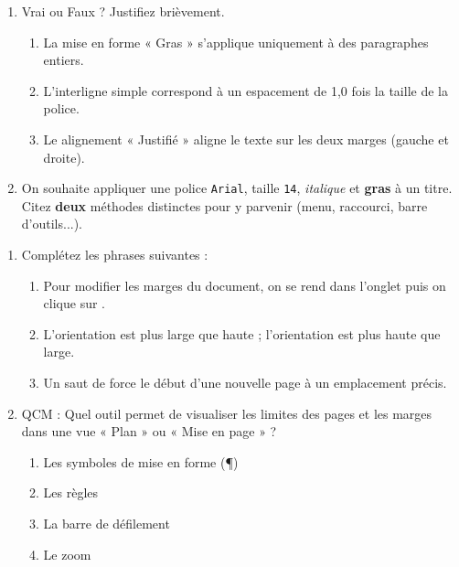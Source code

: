 \documentclass[11pt]{article}
\begin{document}
\begin{exercice}
\begin{enumerate}
    \item Vrai ou Faux ? Justifiez brièvement.
    \begin{enumerate}
        \item La mise en forme « Gras » s'applique uniquement à des paragraphes entiers.
        \item L'interligne simple correspond à un espacement de 1,0 fois la taille de la police.
        \item Le alignement « Justifié » aligne le texte sur les deux marges (gauche et droite).
    \end{enumerate}
    \item On souhaite appliquer une police \texttt{Arial}, taille \texttt{14}, \textit{italique} et \textbf{gras} à un titre. Citez \textbf{deux} méthodes distinctes pour y parvenir (menu, raccourci, barre d'outils...).
\end{enumerate}
\end{exercice}

\begin{exercice}
\begin{enumerate}
    \item Complétez les phrases suivantes :
    \begin{enumerate}
        \item Pour modifier les marges du document, on se rend dans l'onglet \underline{\hspace{3cm}} puis on clique sur \underline{\hspace{3cm}}.
        \item L'orientation \underline{\hspace{2cm}} est plus large que haute ; l'orientation \underline{\hspace{2cm}} est plus haute que large.
        \item Un saut de \underline{\hspace{3cm}} force le début d'une nouvelle page à un emplacement précis.
    \end{enumerate}
    \item QCM : Quel outil permet de visualiser les limites des pages et les marges dans une vue « Plan » ou « Mise en page » ?
    \begin{enumerate}
        \item Les symboles de mise en forme (¶)
        \item Les règles
        \item La barre de défilement
        \item Le zoom
    \end{enumerate}
\end{enumerate}
\end{exercice}
\end{document}
